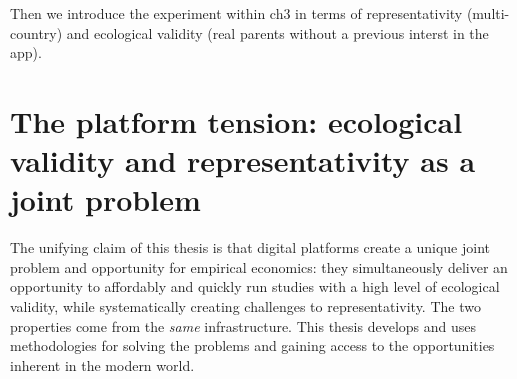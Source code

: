 Then we introduce the experiment within ch3 in terms of representativity (multi-country) and ecological validity (real parents without a previous interst in the app). 






\section{The platform tension: ecological validity and representativity as a joint problem}
\label{sec:intro:tension}

The unifying claim of this thesis is that digital platforms create a unique joint problem and opportunity for empirical economics: they simultaneously deliver an opportunity to affordably and quickly run studies with a high level of ecological validity, while systematically creating challenges to representativity. The two properties come from the \emph{same} infrastructure. This thesis develops and uses methodologies for solving the problems and gaining access to the opportunities inherent in the modern world. 


